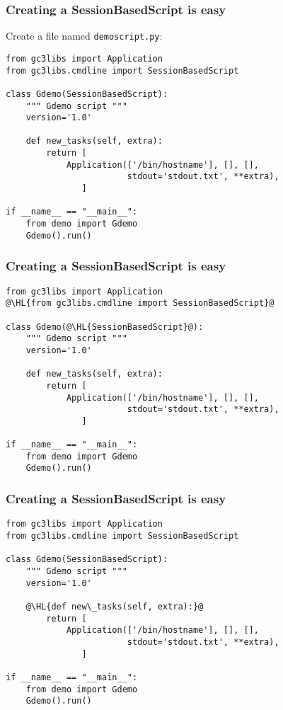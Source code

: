 \documentclass[english,serif,mathserif,xcolor=pdftex,dvipsnames,table]{beamer}
\begin{document}
\begin{frame}[fragile]
  \frametitle{Creating a SessionBasedScript is easy}
Create a file named \texttt{demoscript.py}:
\+
  \begin{lstlisting}
from gc3libs import Application
from gc3libs.cmdline import SessionBasedScript

class Gdemo(SessionBasedScript):
    """ Gdemo script """
    version='1.0'

    def new_tasks(self, extra):
        return [
            Application(['/bin/hostname'], [], [],
                        stdout='stdout.txt', **extra),
               ]

if __name__ == "__main__":
    from demo import Gdemo
    Gdemo().run()
  \end{lstlisting}
\end{frame}

\begin{frame}[fragile]
  \frametitle{Creating a SessionBasedScript is easy}
  \begin{lstlisting}
from gc3libs import Application
@\HL{from gc3libs.cmdline import SessionBasedScript}@

class Gdemo(@\HL{SessionBasedScript}@):
    """ Gdemo script """
    version='1.0'

    def new_tasks(self, extra):
        return [
            Application(['/bin/hostname'], [], [],
                        stdout='stdout.txt', **extra),
               ]

if __name__ == "__main__":
    from demo import Gdemo
    Gdemo().run()
  \end{lstlisting}
\end{frame}


\begin{frame}[fragile]
  \frametitle{Creating a SessionBasedScript is easy}
  \begin{lstlisting}
from gc3libs import Application
from gc3libs.cmdline import SessionBasedScript

class Gdemo(SessionBasedScript):
    """ Gdemo script """
    version='1.0'

    @\HL{def new\_tasks(self, extra):}@
        return [
            Application(['/bin/hostname'], [], [],
                        stdout='stdout.txt', **extra),
               ]

if __name__ == "__main__":
    from demo import Gdemo
    Gdemo().run()
  \end{lstlisting}
\end{frame}
\end{document}
